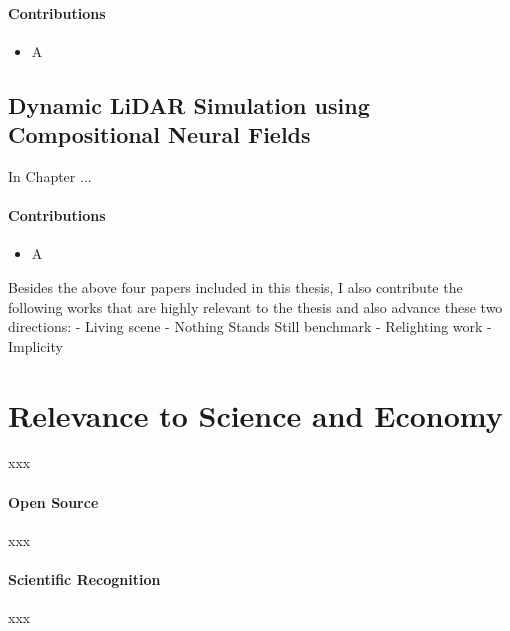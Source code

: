 \paragraph{Contributions}
\begin{itemize}
\item A
\end{itemize}


\subsection{Dynamic LiDAR Simulation using Compositional Neural Fields}

In Chapter ...

\paragraph{Contributions}
\begin{itemize}
\item A
\end{itemize}

Besides the above four papers included in this thesis, I also contribute the following works that are highly relevant to the thesis and also advance these two directions:
- Living scene
- Nothing Stands Still benchmark
- Relighting work
- Implicity





\section{Relevance to Science and Economy}

xxx

\paragraph{Open Source}
xxx

\paragraph{Scientific Recognition}
xxx